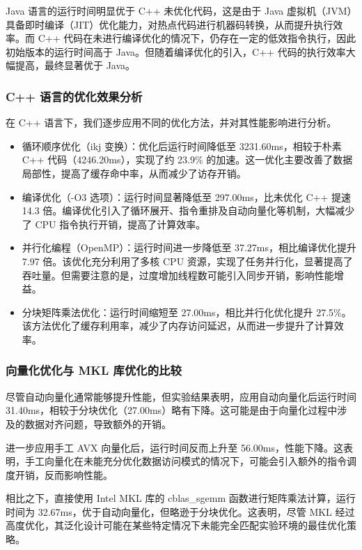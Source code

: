 \documentclass[a4paper, utf8]{ctexart}
\begin{document}
	Java 语言的运行时间明显优于 C++ 未优化代码，这是由于 Java 虚拟机（JVM）具备即时编译（JIT）优化能力，对热点代码进行机器码转换，从而提升执行效率。而 C++ 代码在未进行编译优化的情况下，仍存在一定的低效指令执行，因此初始版本的运行时间高于 Java。但随着编译优化的引入，C++ 代码的执行效率大幅提高，最终显著优于 Java。
	
	\subsubsection{C++ 语言的优化效果分析}
	
	在 C++ 语言下，我们逐步应用不同的优化方法，并对其性能影响进行分析。
	
	\begin{itemize}[itemsep=4pt, topsep=2pt, parsep=2pt]
		\item 循环顺序优化（ikj 变换）：优化后运行时间降低至 3231.60ms，相较于朴素 C++ 代码（4246.20ms），实现了约 23.9\% 的加速。这一优化主要改善了数据局部性，提高了缓存命中率，从而减少了访存开销。
		\item 编译优化（-O3 选项）：运行时间显著降低至 297.00ms，比未优化 C++ 提速 14.3 倍。编译优化引入了循环展开、指令重排及自动向量化等机制，大幅减少了 CPU 指令执行开销，提高了计算效率。
		\item 并行化编程（OpenMP）：运行时间进一步降低至 37.27ms，相比编译优化提升 7.97 倍。该优化充分利用了多核 CPU 资源，实现了任务并行化，显著提高了吞吐量。但需要注意的是，过度增加线程数可能引入同步开销，影响性能增益。
		\item 分块矩阵乘法优化：运行时间缩短至 27.00ms，相比并行化优化提升 27.5\%。该方法优化了缓存利用率，减少了内存访问延迟，从而进一步提升了计算效率。
	\end{itemize}
	
	\subsubsection{向量化优化与 MKL 库优化的比较}
	
	尽管自动向量化通常能够提升性能，但实验结果表明，应用自动向量化后运行时间 31.40ms，相较于分块优化（27.00ms）略有下降。这可能是由于向量化过程中涉及的数据对齐问题，导致额外的开销。
	
	进一步应用手工 AVX 向量化后，运行时间反而上升至 56.00ms，性能下降。这表明，手工向量化在未能充分优化数据访问模式的情况下，可能会引入额外的指令调度开销，反而影响性能。
	
	相比之下，直接使用 Intel MKL 库的 cblas\_sgemm 函数进行矩阵乘法计算，运行时间为 32.67ms，优于自动向量化，但略逊于分块优化。这表明，尽管 MKL 经过高度优化，其泛化设计可能在某些特定情况下未能完全匹配实验环境的最佳优化策略。
	
\end{document}
